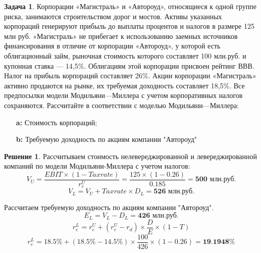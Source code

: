 \documentclass[a4paper, 14pt]{article}
\theoremstyle{plain} %
\theoremstyle{definition} %
\newtheorem*{solution}{Решение}
\newtheorem{problem}{Задача}[subsection]
\theoremstyle{remark} %
\begin{document}
\begin{problem}
	Корпорации «Магистраль» и «Автороуд», относящиеся к одной группе риска, занимаются строительством дорог и мостов. Активы указанных корпораций генерируют прибыль до выплаты процентов и налогов в размере 125 млн руб. «Магистраль» не прибегает к использованию заемных источников финансирования в отличие от корпорации «Автороуд», у которой есть облигационный займ, рыночная стоимость которого составляет 100 млн.руб. и купонная ставка — 14,5\%. Облигациям этой корпорации присвоен рейтинг ВВВ. Налог на прибыль корпораций составляет 26\%. Акции корпорации «Магистраль» активно продаются на рынке, их требуемая доходность составляет 18,5\%. Все предпосылки модели Модильяни—Миллера с учетом корпоративных налогов сохраняются. Рассчитайте в соответствии с моделью Модильяни—Миллера:
	\begin{itemize}
		\item[\textbf{a:}] Стоимость корпораций;
		\item[\textbf{b:}] Требуемую доходность по акциям компании "Автороуд"
	\end{itemize}
	\begin{solution}
		Рассчитываем стоимость нелевереджированной и левереджированной компаний по модели Модильяни-Миллера с учетом налогов:
		\[V_{U}=\frac{EBIT\times(1-Taxrate)}{r_{e}^{U}}=\frac{125\times(1-0.26)}{0.185} = \textbf{500 млн.руб.}\]
		\[V_{L}= V_{U} + Taxrate \times D_{L} = \textbf{526 млн.руб.}\]

		Рассчитаем требуемую доходность по акциям компании "Автороуд".
		\[E_{L} = V_{L} - D_{L} = \textbf{426 млн.руб.}\]
		\[r_{e}^{L} = r_{e}^{U} + (r_{e}^{U}-r_{d})\times \frac{D}{E}\times(1-T)\]
		\[r_{e}^{L} = 18.5\% + (18.5\%-14.5\%)\times \frac{100}{426}\times(1-0.26) = \textbf{19.1948\%}\]
	\end{solution}
\end{problem}
\end{document}

